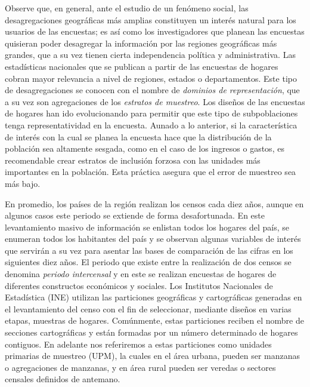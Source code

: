 \documentclass[
  12pt,
  spanish,
]{book}
\begin{document}
Observe que, en general, ante el estudio de un fenómeno social, las desagregaciones geográficas más amplias constituyen un interés natural para los usuarios de las encuestas; es así como los investigadores que planean las encuestas quisieran poder desagregar la información por las regiones geográficas más grandes, que a su vez tienen cierta independencia política y administrativa. Las estadísticas nacionales que se publican a partir de las encuestas de hogares cobran mayor relevancia a nivel de regiones, estados o departamentos. Este tipo de desagregaciones se conocen con el nombre de \emph{dominios de representación}, que a su vez son agregaciones de los \emph{estratos de muestreo}. Los diseños de las encuestas de hogares han ido evolucionando para permitir que este tipo de subpoblaciones tenga representatividad en la encuesta. Aunado a lo anterior, si la característica de interés con la cual se planea la encuesta hace que la distribución de la población sea altamente sesgada, como en el caso de los ingresos o gastos, es recomendable crear estratos de inclusión forzosa con las unidades más importantes en la población. Esta práctica asegura que el error de muestreo sea más bajo.

En promedio, los países de la región realizan los censos cada diez años, aunque en algunos casos este periodo se extiende de forma desafortunada. En este levantamiento masivo de información se enlistan todos los hogares del país, se enumeran todos los habitantes del país y se observan algunas variables de interés que servirán a su vez para asentar las bases de comparación de las cifras en los siguientes diez años. El periodo que existe entre la realización de dos censos se denomina \emph{periodo intercensal} y en este se realizan encuestas de hogares de diferentes constructos económicos y sociales. Los Institutos Nacionales de Estadística (INE) utilizan las particiones geográficas y cartográficas generadas en el levantamiento del censo con el fin de seleccionar, mediante diseños en varias etapas, muestras de hogares. Comúnmente, estas particiones reciben el nombre de secciones cartográficas y están formadas por un número determinado de hogares contiguos. En adelante nos referiremos a estas particiones como unidades primarias de muestreo (UPM), la cuales en el área urbana, pueden ser manzanas o agregaciones de manzanas, y en área rural pueden ser veredas o sectores censales definidos de antemano.
\end{document}
